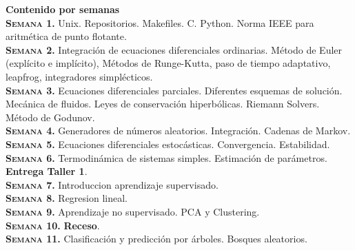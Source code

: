 \documentclass[letterpaper,10pt,onecolumn]{article}
\begin{document}
\noindent\textbf{\large {} \quad Contenido por
  semanas}\\[-0.2cm] 



\noindent\normalsize\textbf{\textsc{Semana 1.}}
Unix. Repositorios. Makefiles. C. Python. Norma IEEE para aritm\'etica de punto
flotante. 
\\[-0.3cm]

\noindent\textbf{\textsc{Semana 2.}} Integraci\'on de ecuaciones
diferenciales ordinarias. M\'etodo de Euler (expl\'icito e
impl\'icito), M\'etodos de Runge-Kutta, paso de tiempo adaptativo,
leapfrog, integradores simpl\'ecticos.
\\[-0.3cm]  

\noindent\textbf{\textsc{Semana 3.}} 
Ecuaciones diferenciales parciales. Diferentes esquemas de
soluci\'on. Mec\'anica de fluidos. Leyes de conservaci\'on
hiperb\'olicas. Riemann Solvers. M\'etodo de Godunov.
\\[-0.3cm]  

\noindent\textbf{\textsc{Semana 4.}} 
Generadores de n\'umeros aleatorios. Integraci\'on. Cadenas de Markov. 
\\[-0.3cm]  

\noindent\textbf{\textsc{Semana 5.}}
Ecuaciones diferenciales estoc\'asticas. Convergencia. Estabilidad.
\\[-0.3cm]

\noindent\textbf{\textsc{Semana 6.}} 
Termodin\'amica de sistemas simples. Estimaci\'on de par\'ametros. 
{\bf Entrega Taller 1}.
\\[-0.3cm]  

\noindent\textbf{\textsc{Semana 7.}} 
Introduccion aprendizaje supervisado. 
\\[-0.3cm] 

\noindent\textbf{\textsc{Semana 8.}} 
Regresion lineal.
\\[-0.3cm]  

\noindent\textbf{\textsc{Semana 9.}} 
Aprendizaje no supervisado. PCA y  Clustering.
\\[-0.3cm] 

\noindent\textbf{\textsc{Semana 10.}}  
{\bf Receso}.
\\[-0.3cm] 

\noindent\textbf{\textsc{Semana 11.}}  
Clasificaci\'on y predicci\'on por \'arboles. Bosques aleatorios.
\\[-0.3cm] 
\end{document}
